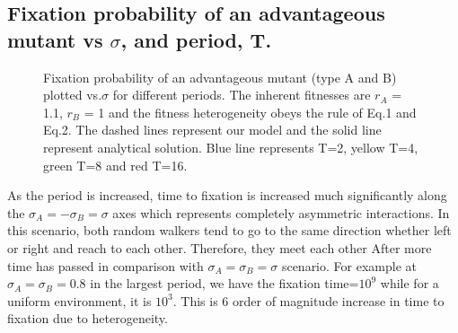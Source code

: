 \documentclass{article}
\begin{document}
\subsection{Fixation probability of an advantageous mutant vs $\sigma$, and period, T.}
\begin{figure}[H]
    \centering
    \qquad
    \caption{Fixation probability of an advantageous mutant (type A and B) plotted vs.$\sigma$ for different periods. The inherent fitnesses are $r_A$ = 1.1, $r_B$ = 1 and the fitness heterogeneity obeys the rule of Eq.1 and Eq.2. The dashed lines represent our model and the solid line represent analytical solution. Blue line represents T=2, yellow T=4, green T=8 and red T=16. }
\end{figure}
As the period is increased, time to fixation is increased much significantly along the $\sigma_A = - \sigma_B = \sigma$ axes which represents completely asymmetric interactions. In this scenario, both random walkers tend to go to the same direction whether left or right and reach to each other. Therefore, they meet each other After more time has passed in comparison with $\sigma_A =  \sigma_B = \sigma$ scenario. For example at $\sigma_A =  \sigma_B = 0.8$ in the largest period, we have the fixation time=$10^9$ while for a uniform environment, it is $10^3$. This is 6 order of magnitude increase in
time to fixation due to heterogeneity.
\end{document}
